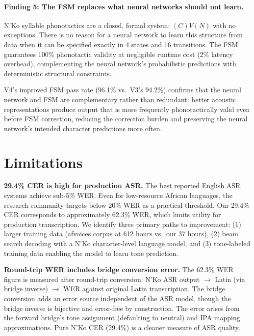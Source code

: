 \documentclass[11pt]{article}
\begin{document}
\paragraph{Finding 5: The FSM replaces what neural networks should not learn.}
N'Ko syllable phonotactics are a closed, formal system: $(C)V(N)$ with no exceptions.
There is no reason for a neural network to learn this structure from data when it can be specified exactly in 4 states and 16 transitions.
The FSM guarantees 100\% phonotactic validity at negligible runtime cost (2\% latency overhead), complementing the neural network's probabilistic predictions with deterministic structural constraints.

V4's improved FSM pass rate (96.1\% vs.\ V3's 94.2\%) confirms that the neural network and FSM are complementary rather than redundant: better acoustic representations produce output that is more frequently phonotactically valid even before FSM correction, reducing the correction burden and preserving the neural network's intended character predictions more often.

\section{Limitations}

\textbf{29.4\% CER is high for production ASR.}
The best reported English ASR systems achieve sub-5\% WER.
Even for low-resource African languages, the research community targets below 20\% WER as a practical threshold.
Our 29.4\% CER corresponds to approximately 62.3\% WER, which limits utility for production transcription.
We identify three primary paths to improvement: (1) larger training data (afvoices corpus at 612 hours vs.\ our 37 hours), (2) beam search decoding with a N'Ko character-level language model, and (3) tone-labeled training data enabling the model to learn tone prediction.

\textbf{Round-trip WER includes bridge conversion error.}
The 62.3\% WER figure is measured after round-trip conversion: N'Ko ASR output $\to$ Latin (via bridge inverse) $\to$ WER against original Latin transcription.
The bridge conversion adds an error source independent of the ASR model, though the bridge inverse is bijective and error-free by construction.
The error arises from the forward bridge's tone assignment (defaulting to neutral) and IPA mapping approximations.
Pure N'Ko CER (29.4\%) is a cleaner measure of ASR quality.
\end{document}
